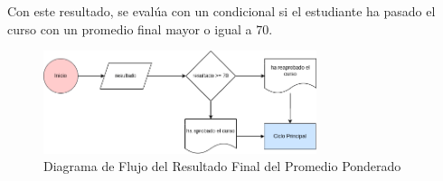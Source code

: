 \documentclass{article}
\begin{document}
Con este resultado, se evalúa con un condicional si el estudiante ha pasado el curso con un promedio final mayor o igual a 70.

\begin{figure}[H]
    \centering
    \includegraphics[width=8cm]{promedio_ponderado_salida}
    \caption{Diagrama de Flujo del Resultado Final del Promedio Ponderado}
\end{figure}
\end{document}
